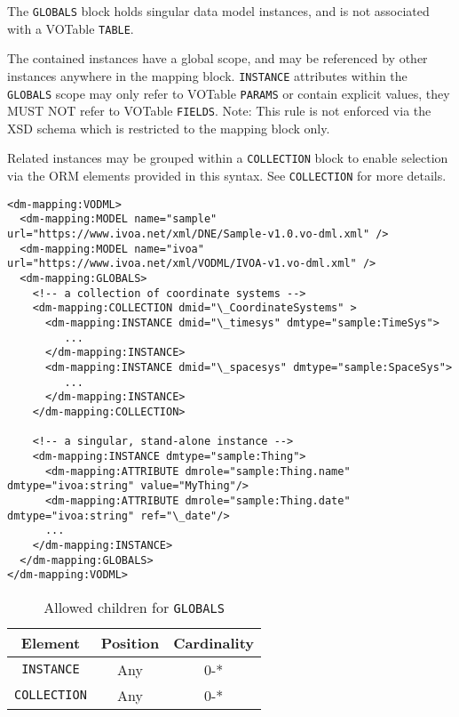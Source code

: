 The \texttt{GLOBALS} block holds singular data model instances, and is not associated 
with a VOTable \texttt{TABLE}.

The contained instances have a global scope, and may be
referenced by other instances anywhere in the mapping block.  \texttt{INSTANCE} attributes
within the \texttt{GLOBALS} scope may only refer to VOTable \texttt{PARAMS} or contain
explicit values, they MUST NOT refer to VOTable \texttt{FIELDS}.  Note: This rule is not enforced
via the XSD schema which is restricted to the mapping block only.

Related instances may be grouped within a \texttt{COLLECTION} block to enable selection
via the ORM elements provided in this syntax.  See \texttt{COLLECTION} for more details.

\begin{lstlisting}[frame=single,caption={Example \texttt{GLOBALS} block},style=XML,basicstyle=\tiny]
<dm-mapping:VODML>
  <dm-mapping:MODEL name="sample" url="https://www.ivoa.net/xml/DNE/Sample-v1.0.vo-dml.xml" />
  <dm-mapping:MODEL name="ivoa"   url="https://www.ivoa.net/xml/VODML/IVOA-v1.vo-dml.xml" />
  <dm-mapping:GLOBALS>
    <!-- a collection of coordinate systems -->
    <dm-mapping:COLLECTION dmid="\_CoordinateSystems" >
      <dm-mapping:INSTANCE dmid="\_timesys" dmtype="sample:TimeSys">
         ...
      </dm-mapping:INSTANCE>
      <dm-mapping:INSTANCE dmid="\_spacesys" dmtype="sample:SpaceSys">
         ...
      </dm-mapping:INSTANCE>
    </dm-mapping:COLLECTION>

    <!-- a singular, stand-alone instance -->
    <dm-mapping:INSTANCE dmtype="sample:Thing">
      <dm-mapping:ATTRIBUTE dmrole="sample:Thing.name" dmtype="ivoa:string" value="MyThing"/>
      <dm-mapping:ATTRIBUTE dmrole="sample:Thing.date" dmtype="ivoa:string" ref="\_date"/>
      ...
    </dm-mapping:INSTANCE>
  </dm-mapping:GLOBALS>
</dm-mapping:VODML>
\end{lstlisting}


\begin{table}[!htbp]
  \small
  \centering
  \begin{tabulary}{\linewidth}{|c |c |c|}
    \hline 
        \textbf{Element} &
        \textbf{Position} &
        \textbf{Cardinality}\\
    \hline
    \hline
        \texttt{INSTANCE} &
        Any &
        0-*\\
    \hline
        \texttt{COLLECTION} &
        Any &
        0-*\\
    \hline
  \end{tabulary}
  \caption{Allowed children for \texttt{GLOBALS}} 
  \label{tbl:globals-children}
 \end{table}
